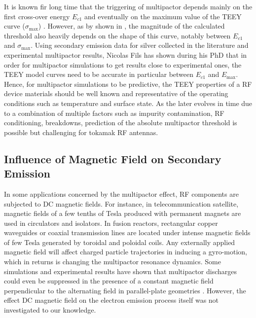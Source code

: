 It is known fir long time that the triggering of multipactor depends mainly on the first cross-over energy  $E_{c1}$ and eventually on the maximum value of the TEEY curve ($\sigma_{\max}$) . However, as by shown in , the magnitude of the calculated threshold also heavily depends on the shape of this curve, notably between $E_{c1}$ and $\sigma_{\max}$. Using secondary emission data for silver collected in the literature and experimental multipactor results, Nicolas Fils has shown during his PhD that in order for multipactor simulations to get results close to experimental ones, the TEEY model curves need to be accurate in particular between $E_{c1}$ and $E_{\max}$. Hence, for multipactor simulations to be predictive, the TEEY properties of a RF device materials should be well known and representative of the operating conditions such as temperature and surface state. As the later evolves in time due to a combination of multiple factors such as impurity contamination, RF conditioning, breakdowns, prediction of the absolute multipactor threshold is possible but challenging for tokamak RF antennas.

\subsection[Influence of Magnetic Field]{Influence of Magnetic Field on Secondary Emission}\label{sec:multipactor_magnetic_field}
In some applications concerned by the multipactor effect, RF components are subjected to DC magnetic fields. For instance, in telecommunication satellite, magnetic fields of a few tenths of Tesla produced with permanent magnets are used in circulators and isolators. In fusion reactors, rectangular copper waveguides or coaxial transmission lines are located under intense magnetic fields of few Tesla generated by toroidal and poloidal coils. Any externally applied magnetic field will affect charged particle trajectories in inducing a gyro-motion, which in returns is changing the multipactor resonance dynamics. Some simulations and experimental results have  shown that multipactor discharges could even be suppressed in the presence of a constant magnetic field perpendicular to the alternating field in parallel-plate geometries . However, the effect DC magnetic field on the electron emission process itself was not investigated to our knowledge.

